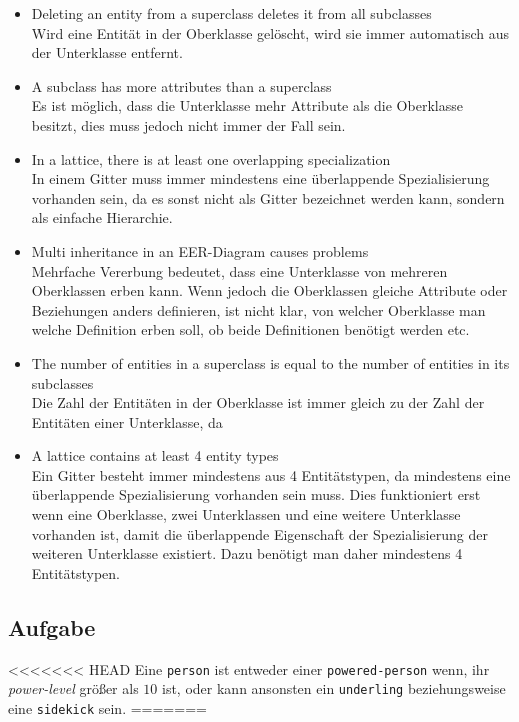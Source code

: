 \documentclass[11pt,a4paper,DIV=9]{scrartcl}
\newcounter{temp}
\newcommand{\aufgabe}[1]{
  \setcounter{temp}{\value{subsection}}
  \setcounter{subsection}{#1}
  \addtocounter{subsection}{-1}
  \subsection{Aufgabe}
  \setcounter{subsection}{\value{temp}}
}
\begin{document}
\begin{itemize}
 \item Deleting an entity from a superclass deletes it from all subclasses
 \\ Wird eine Entit\"at in der Oberklasse gel\"oscht, wird sie immer automatisch aus der Unterklasse entfernt. \\
 \item A subclass has more attributes than a superclass
 \\ Es ist m\"oglich, dass die Unterklasse mehr Attribute als die Oberklasse besitzt, dies muss jedoch nicht immer der Fall sein. \\
 \item In a lattice, there is at least one overlapping specialization
 \\ In einem Gitter muss immer mindestens eine \"uberlappende Spezialisierung vorhanden sein, da es sonst nicht als Gitter bezeichnet werden kann, sondern als einfache Hierarchie. \\
 \item Multi inheritance in an EER-Diagram causes problems
 \\ Mehrfache Vererbung bedeutet, dass eine Unterklasse von mehreren Oberklassen erben kann. Wenn jedoch die Oberklassen gleiche Attribute oder Beziehungen anders definieren, ist nicht klar, von welcher Oberklasse man welche Definition erben soll, ob beide Definitionen ben\"otigt werden etc. \\
 \item The number of entities in a superclass is equal to the number of entities in its subclasses
 \\ Die Zahl der Entit\"aten in der Oberklasse ist immer gleich zu der Zahl der Entit\"aten einer Unterklasse, da
 \item A lattice contains at least 4 entity types
 \\ Ein Gitter besteht immer mindestens aus 4 Entit\"atstypen, da mindestens eine \"uberlappende Spezialisierung vorhanden sein muss. Dies funktioniert erst wenn eine Oberklasse, zwei Unterklassen und eine weitere Unterklasse vorhanden ist, damit die \"uberlappende Eigenschaft der Spezialisierung der weiteren Unterklasse existiert. Dazu ben\"otigt man daher mindestens 4 Entit\"atstypen. \\
\end{itemize}
\aufgabe{4}
<<<<<<< HEAD
  Eine \texttt{person} ist entweder einer \texttt{powered-person} wenn, ihr \textit{power-level} größer als $10$ ist, oder kann ansonsten ein \texttt{underling} beziehungsweise eine \texttt{sidekick} sein.
=======
\end{document}
